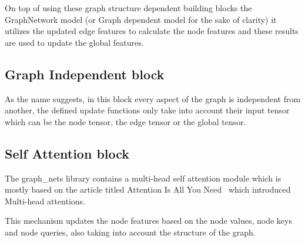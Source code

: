 
On top of using these graph structure dependent building blocks the GraphNetwork model (or Graph dependent model for the sake of clarity) it utilizes the updated edge features to calculate the node features and these results are used to update the global features.

\subsection{Graph Independent block}
As the name suggests, in this block every aspect of the graph is independent from another, the defined update functions only take into account their input tensor which can be the node tensor, the edge tensor or the global tensor.

\subsection{Self Attention block}
The graph\_nets library contains a multi-head self attention module which is mostly based on the article titled Attention Is All You Need~\cite{Multihead} which introduced Multi-head attentions.

This mechanism updates the node features based on the node values, node keys and node queries, also taking into account the structure of the graph.